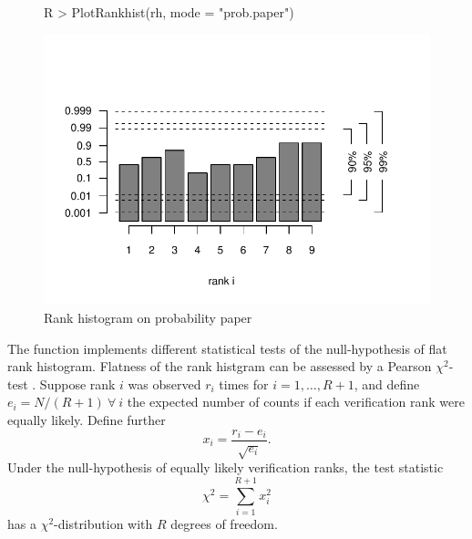 \documentclass[article]{jss}
\begin{document}
\begin{figure}
\begin{center}
%
\begin{Schunk}
\begin{Sinput}
R > PlotRankhist(rh, mode = "prob.paper")
\end{Sinput}
\end{Schunk}
\includegraphics{fig-rank-hist-pp}
%
\end{center}
\caption{Rank histogram on probability paper}
\label{fig:rank-hist-pp}
\end{figure}


The function  implements different statistical tests of the null-hypothesis of flat rank histogram.
Flatness of the rank histgram can be assessed by a Pearson $\chi^2$-test \citep{pearson1900criterion}.
Suppose rank $i$ was observed $r_i$ times for $i=1,\dots,R+1$, and define $e_i=N/(R+1)\ \forall\ i$ the expected number of counts if each verification rank were equally likely.
Define further
\begin{equation}
x_i = \frac{r_i - e_i}{\sqrt{e_i}}.
\end{equation}
%
Under the null-hypothesis of equally likely verification ranks, the test statistic
%
\begin{equation}
\chi^2 = \sum_{i=1}^{R+1} x_i^2
\end{equation}
%
has a $\chi^2$-distribution with $R$ degrees of freedom.
\end{document}
